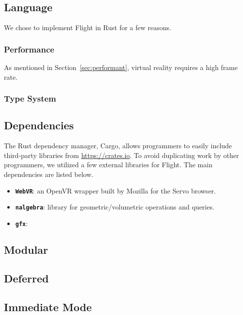 \documentclass[conference,12pt]{IEEEtran}
\begin{document}
\subsection{Language}
We chose to implement Flight in Rust for a few reasons.

\subsubsection{Performance}
As mentioned in Section~\ref{sec:performant}, virtual reality requires a high
frame rate.

\subsubsection{Type System}


\subsection{Dependencies}
The Rust dependency manager, Cargo, allows programmers to easily include
third-party libraries from \url{https://crates.io}. To avoid duplicating work
by other programmers, we utilized a few external libraries for Flight. The main
dependencies are listed below.
\begin{itemize}
    \item \textbf{\texttt{WebVR}}: an OpenVR wrapper built by Mozilla for the
        Servo browser.
    \item \textbf{\texttt{nalgebra}}: library for geometric/volumetric
        operations and queries.
    \item \textbf{\texttt{gfx}}: %
\end{itemize}

\subsection{Modular}

\subsection{Deferred}

\subsection{Immediate Mode}
\end{document}

